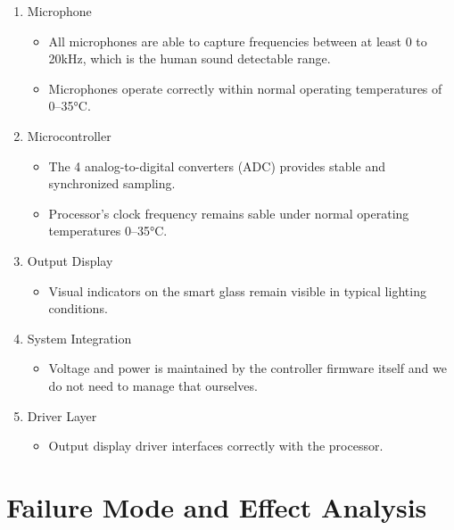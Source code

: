 \documentclass{article}
\begin{document}
\begin{enumerate}
    \item Microphone
    \begin{itemize}
        \item All microphones are able to capture frequencies between at least 0 to 20kHz, which is the human sound detectable range.
        \item Microphones operate correctly within normal operating temperatures of 0–35°C. 
    \end{itemize}
    
    \item Microcontroller
    \begin{itemize}
        \item The 4 analog-to-digital converters (ADC) provides stable and synchronized sampling. 
        \item Processor's clock frequency remains sable under normal operating temperatures 0–35°C. 
    \end{itemize}

    \item Output Display
    \begin{itemize}
        \item Visual indicators on the smart glass remain visible in typical lighting conditions. 
    \end{itemize}

    \item System Integration
    \begin{itemize}
        \item Voltage and power is maintained by the controller firmware itself and we do not need to manage that ourselves. 
    \end{itemize}

    \item Driver Layer
    \begin{itemize}
        \item Output display driver interfaces correctly with the processor. 
    \end{itemize}
\end{enumerate}

\section{Failure Mode and Effect Analysis}
\end{document}
